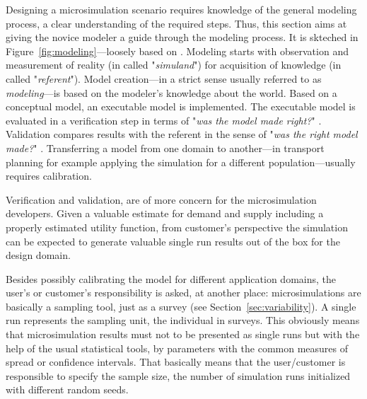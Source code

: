 Designing a \gls{microsimulation} scenario requires knowledge of the general modeling process, \ie a clear understanding of the required steps. Thus, this section aims at giving the novice modeler a guide through the modeling process. It is skteched in Figure~\ref{fig:modeling}---loosely based on \citet[][Figure 10.2]{Petty_SokolowskiBanks_2010}. Modeling starts with observation and measurement of reality (in \citet[][]{Petty_SokolowskiBanks_2010} called "\emph{simuland}") for acquisition of knowledge (in \citet[][]{Petty_SokolowskiBanks_2010} called "\emph{referent}"). Model creation---in a strict sense usually referred to as \emph{modeling}---is based on the modeler's knowledge about the world. Based on a conceptual model, an executable model is implemented. The executable model is evaluated in a verification step in terms of "\emph{was the model made right?}" \citep[][p.332]{Petty_SokolowskiBanks_2010}. Validation compares results with the referent in the sense of "\emph{was the right model made?}" \citep[][p.332]{Petty_SokolowskiBanks_2010}. Transferring a model from one domain to another---in transport planning for example applying the simulation for a different population---usually requires calibration.

Verification and validation, are of more concern for the \gls{microsimulation} developers. Given a valuable estimate for demand and supply including a properly estimated utility function, from customer's perspective the simulation can be expected to generate valuable single run results out of the box for the design domain.

Besides possibly calibrating the model for different application domains, the user's or customer's responsibility is asked, at another place: \Glspl{microsimulation} are basically a sampling tool, just as a survey (see Section~\ref{sec:variability}). A single run represents the sampling unit, the individual in surveys. This obviously means that \gls{microsimulation} results must not to be presented as single runs but with the help of the usual statistical tools, \eg by parameters with the common measures of spread or confidence intervals. That basically means that the user/customer is responsible to specify the sample size, the number of simulation runs initialized with different random seeds. 


